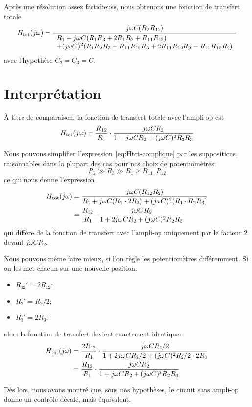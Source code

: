 Après une résolution assez fastidieuse, nous obtenons une fonction de transfert
totale
\begin{equation} \label{eq:Htot-complique}
    H_{\mathrm{tot}}(j\omega) = \frac{j\omega C(R_2R_{12})}
    {\begin{array}{l}
            R_1 + j\omega C(R_1R_3+2R_1R_2+R_{11}R_{12})\\
        + (j\omega C)^2(R_1R_2R_3 + R_{11}R_{12}R_3 + 2R_{11}R_{12}R_2
        - R_{11}R_{12}R_2)
\end{array}}
\end{equation}
avec l'hypothèse $C_2 = C_3 = C$.

\section{Interprétation}

À titre de comparaison, la fonction de transfert totale avec l'ampli-op est
\begin{equation}
    H_{\mathrm{tot}}(j\omega) = \frac{R_{12}}{R_1}\cdot
    \frac{j\omega CR_2}
    {1+j\omega CR_2 + (j\omega C)^2R_2R_3}
\end{equation}

Nous pouvons simplifier l'expression~\eqref{eq:Htot-complique}
par les suppositions, raisonnables dans la plupart des cas
pour nos choix de potentiomètres:
\begin{equation}
    R_2 \gg R_3 \gg R_1 \geq R_{11},R_{12}
\end{equation}
ce qui nous donne l'expression
\begin{equation}
    \begin{split}
        H_{\mathrm{tot}}(j\omega) &= \frac{j\omega C (R_{12} R_2)}
        {R_1 + j\omega C(R_1\cdot 2R_2) + (j\omega C)^2(R_1\cdot R_2R_3)} \\
        &= \frac{R_{12}}{R_1}\cdot
        \frac{j\omega C R_2}{1+2j\omega CR_2 + (j\omega C)^2R_2R_3}
    \end{split}
\end{equation}
qui diffère de la fonction de transfert avec l'ampli-op uniquement
par le facteur 2 devant $j\omega CR_2$.

Nous pouvons même faire mieux,
si l'on règle les potentiomètres différemment.
Si on les met chacun sur une nouvelle position:
\begin{itemize}
    \item $R_{12}' = 2R_{12}$;
    \item $R_2' = R_2/2$;
    \item $R_3' = 2R_3$;
\end{itemize}
alors la fonction de transfert devient exactement identique:
\begin{equation}
    \begin{split}
        H_{\mathrm{tot}}(j\omega) &= \frac{2R_{12}}{R_1} \cdot\frac{j\omega C R_2/2}
        {1+2j\omega CR_2/2 + (j\omega C)^2R_2/2\cdot 2R_3}\\
        &= \frac{R_{12}}{R_1}\cdot\frac{j\omega CR_2}
        {1+j\omega CR_2 + (j\omega C)^2R_2R_3}
    \end{split}
\end{equation}

Dès lors, nous avons montré que, sous nos hypothèses, le circuit sans ampli-op
donne un contrôle décalé, mais équivalent.
